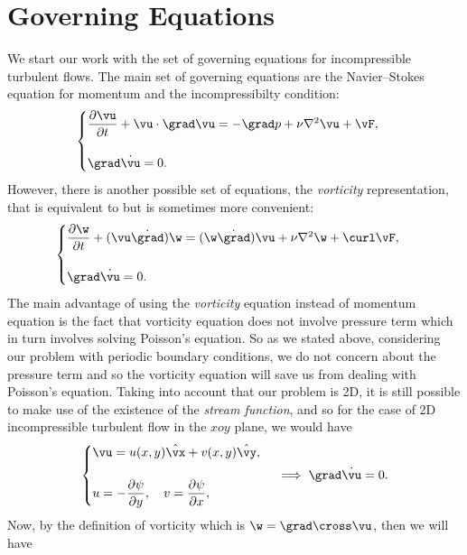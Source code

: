 \documentclass[12pt]{article}
\def\v{\bm}
\def\div{\grad\dot}
\def\lap{{\nabla}^2}
\def\vw{{\v\w}}
\def\hyperindex#1{\index{#1}\hypertarget{#1}}
\def\In#1{\hyperindex{#1}{\emph{#1}}}
\begin{document}
\section{Governing Equations}
We start our work with the set of governing equations for incompressible
turbulent flows. The main set of governing equations are the Navier--Stokes equation for momentum and the incompressibilty condition:
\begin{equation}
\begin{cases}
\dfrac{\partial \vu}{\partial t} + \vu\cdot\grad\vu = -\grad p + \nu\lap\vu + \vF,\\
\\
\div \vu=0.\label{GE}
\end{cases}
\end{equation}
However, there is another possible set of equations,
the \In{vorticity} representation, that is equivalent to  but is
sometimes more convenient:
\begin{equation}\label{vorticity}
\begin{cases}
\dfrac{\partial{\vw}}{\partial t} + (\vu\dot\grad)\vw=(\vw\dot\grad)\vu + \nu\lap\vw + \curl\vF,\\
\\
\div \vu=0.
\end{cases}
\end{equation}
The main advantage of using the \emph{vorticity} equation instead of momentum equation is the fact that vorticity equation does not involve pressure term which in turn involves solving Poisson's equation. So as we stated above, considering our problem with periodic boundary conditions, we do not concern about the pressure term and so the vorticity equation will save us from dealing with Poisson's equation. Taking into account that our problem is 2D, it is still possible to make use of the existence of the
\emph{stream function}, and so for the case of 2D incompressible turbulent flow in the $xoy$ plane, we would have
\begin{equation}
\begin{cases}
\vu=u(x,y)\hat{\vx}+v(x,y)\hat{\vy}, \\
\hspace{3.5cm} 		\\
u=-\dfrac{\partial\psi}{\partial y},\quad v=\dfrac{\partial\psi}{\partial x}, \label{streamfunction}
\end{cases}\implies \div\vu=0.
\end{equation}
Now, by the definition of vorticity which is $\vw=\grad\cross\vu$, then we will have
\end{document}
